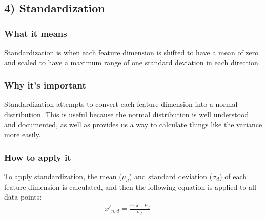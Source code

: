 \documentclass[paper=a4, fontsize=11pt]{scrartcl} %
\numberwithin{equation}{section} %
\numberwithin{figure}{section} %
\numberwithin{table}{section} %
\begin{document}
\subsection*{4) Standardization}
\subsubsection*{What it means}
Standardization is when each feature dimension is shifted to have a mean of zero and scaled to have a maximum range of one standard deviation in each direction.

\subsubsection*{Why it's important}
Standardization attempts to convert each feature dimension into a normal distribution. This is useful because the normal distribution is well understood and documented, as well as provides us a way to calculate things like the variance more easily.

\subsubsection*{How to apply it}
To apply standardization, the mean ($\mu_d$) and standard deviation ($\sigma_d$) of each feature dimension is calculated, and then the following equation is applied to all data points: 
\begin{align*}
	x'_{n,d} = \frac{x_{n,d} - \mu_d}{\sigma_d} &&
\end{align*}
\end{document}
